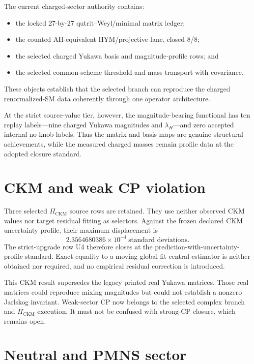 \documentclass[11pt]{article}
\begin{document}
The current charged-sector authority contains:
\begin{itemize}
\item the locked 27-by-27 qutrit--Weyl/minimal matrix ledger;
\item the counted AH-equivalent HYM/projective lane, closed 8/8;
\item the selected charged Yukawa basis and magnitude-profile rows; and
\item the selected common-scheme threshold and mass transport with covariance.
\end{itemize}
These objects establish that the selected branch can reproduce the charged
renormalized-SM data coherently through one operator architecture.

At the strict source-value tier, however, the magnitude-bearing functional has
ten replay labels---nine charged Yukawa magnitudes and $\lambda_H$---and zero
accepted internal no-knob labels. Thus the matrix and basis maps are genuine
structural achievements, while the measured charged masses remain profile data
at the adopted closure standard.

\section{CKM and weak CP violation}

Three selected $\Pi_{\mathrm{CKM}}$ source rows are retained. They use neither
observed CKM values nor target residual fitting as selectors. Against the
frozen declared CKM uncertainty profile, their maximum displacement is
\begin{equation}
2.3564680386\times10^{-4}\ \text{standard deviations}.
\end{equation}
The strict-upgrade row U4 therefore closes at the
prediction-with-uncertainty-profile standard. Exact equality to a moving global
fit central estimator is neither obtained nor required, and no empirical
residual correction is introduced.

This CKM result supersedes the legacy printed real Yukawa matrices. Those real
matrices could reproduce mixing magnitudes but could not establish a nonzero
Jarlskog invariant. Weak-sector CP now belongs to the selected complex branch
and $\Pi_{\mathrm{CKM}}$ execution. It must not be confused with strong-CP
closure, which remains open.

\section{Neutral and PMNS sector}
\end{document}
